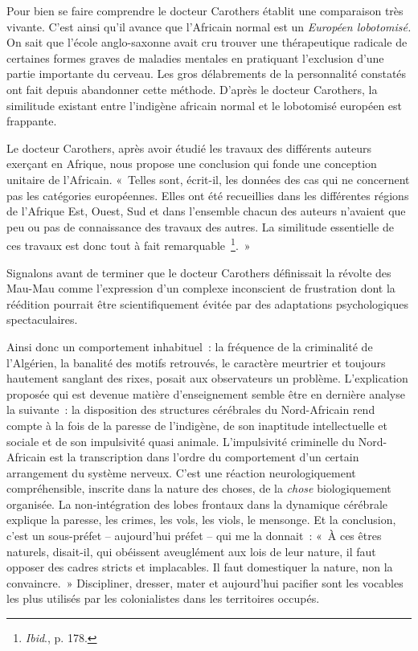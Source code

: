 \documentclass[french,twoside]{book} %
\begin{document}
Pour bien se faire comprendre le docteur Carothers établit une comparaison très vivante. C’est ainsi qu’il avance que l’Africain normal est un \emph{Européen lobotomisé.} On sait que l’école anglo-saxonne avait cru trouver une thérapeutique radicale de certaines formes graves de maladies mentales en pratiquant l’exclusion d’une partie importante du cerveau. Les gros délabrements de la personnalité constatés ont fait depuis abandonner cette méthode. D’après le docteur Carothers, la similitude existant entre l’indigène africain normal et le lobotomisé européen est frappante.\par
Le docteur Carothers, après avoir étudié les travaux des différents auteurs exerçant en Afrique, nous propose une conclusion qui fonde une conception unitaire de l’Africain. « Telles sont, écrit-il, les données des cas qui ne concernent pas les catégories européennes. Elles ont été recueillies dans les différentes régions de l’Afrique Est, Ouest, Sud et dans l’ensemble chacun des auteurs n’avaient que peu ou pas de connaissance des travaux des autres. La similitude essentielle de ces travaux est donc tout à fait remarquable \footnote{\emph{Ibid}., p. 178.}. »\par
Signalons avant de terminer que le docteur Carothers définissait la révolte des Mau-Mau comme l’expression d’un complexe inconscient de frustration dont la réédition pourrait être scientifiquement évitée par des adaptations psychologiques spectaculaires.\par
Ainsi donc un comportement inhabituel : la fréquence de la criminalité de l’Algérien, la banalité des motifs retrouvés, le caractère meurtrier et toujours hautement sanglant des rixes,   posait aux observateurs un problème. L’explication proposée qui est devenue matière d’enseignement semble être en dernière analyse la suivante : la disposition des structures cérébrales du Nord-Africain rend compte à la fois de la paresse de l’indigène, de son inaptitude intellectuelle et sociale et de son impulsivité quasi animale. L’impulsivité criminelle du Nord-Africain est la transcription dans l’ordre du comportement d’un certain arrangement du système nerveux. C’est une réaction neurologiquement compréhensible, inscrite dans la nature des choses, de la \emph{chose} biologiquement organisée. La non-intégration des lobes frontaux dans la dynamique cérébrale explique la paresse, les crimes, les vols, les viols, le mensonge. Et la conclusion, c’est un sous-préfet – aujourd’hui préfet – qui me la donnait : « À ces êtres naturels, disait-il, qui obéissent aveuglément aux lois de leur nature, il faut opposer des cadres stricts et implacables. Il faut domestiquer la nature, non la convaincre. » Discipliner, dresser, mater et aujourd’hui pacifier sont les vocables les plus utilisés par les colonialistes dans les territoires occupés.\par
\end{document}
